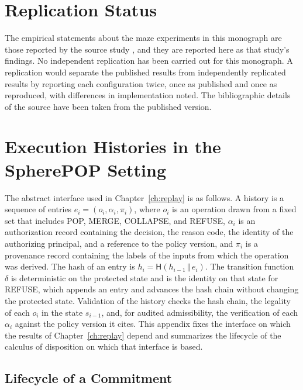 \chapter{Replication Status}
\label{app:replication}

The empirical statements about the maze experiments in this monograph are those reported by the source study \cite{valmeekam2026}, and they are reported here as that study's findings. No independent replication has been carried out for this monograph. A replication would separate the published results from independently replicated results by reporting each configuration twice, once as published and once as reproduced, with differences in implementation noted. The bibliographic details of the source have been taken from the published version.

\chapter{Execution Histories in the SpherePOP Setting}
\label{app:spherepop}

The abstract interface used in Chapter~\ref{ch:replay} is as follows. A history is a sequence of entries $e_i=(o_i,\alpha_i,\pi_i)$, where $o_i$ is an operation drawn from a fixed set that includes POP, MERGE, COLLAPSE, and REFUSE, $\alpha_i$ is an authorization record containing the decision, the reason code, the identity of the authorizing principal, and a reference to the policy version, and $\pi_i$ is a provenance record containing the labels of the inputs from which the operation was derived. The hash of an entry is $h_i=\mathsf H(h_{i-1}\,\Vert\,e_i)$. The transition function $\delta$ is deterministic on the protected state and is the identity on that state for REFUSE, which appends an entry and advances the hash chain without changing the protected state. Validation of the history checks the hash chain, the legality of each $o_i$ in the state $s_{i-1}$, and, for audited admissibility, the verification of each $\alpha_i$ against the policy version it cites. This appendix fixes the interface on which the results of Chapter~\ref{ch:replay} depend and summarizes the lifecycle of the calculus of disposition \cite{flyxion2026b} on which that interface is based.

\section*{Lifecycle of a Commitment}

